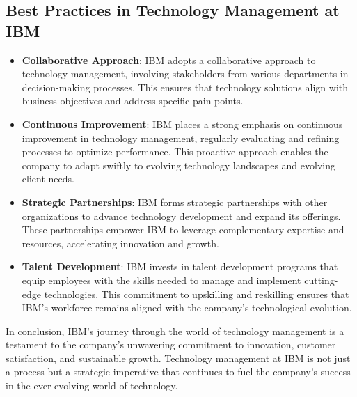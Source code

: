   \subsection{Best Practices in Technology Management at IBM }

  \begin{itemize}
  \item \textbf{Collaborative Approach}:
IBM adopts a collaborative approach to technology management, involving stakeholders from various departments in decision-making processes. This ensures that technology solutions align with business objectives and address specific pain points.

    
  \item \textbf{Continuous Improvement}:
IBM places a strong emphasis on continuous improvement in technology management, regularly evaluating and refining processes to optimize performance. This proactive approach enables the company to adapt swiftly to evolving technology landscapes and evolving client needs.

    
  \item \textbf{Strategic Partnerships}:
IBM forms strategic partnerships with other organizations to advance technology development and expand its offerings. These partnerships empower IBM to leverage complementary expertise and resources, accelerating innovation and growth.

    
  \item \textbf{Talent Development}:
IBM invests in talent development programs that equip employees with the skills needed to manage and implement cutting-edge technologies. This commitment to upskilling and reskilling ensures that IBM's workforce remains aligned with the company's technological evolution.


  \end{itemize}
  
  In conclusion, IBM's journey through the world of technology management is a testament to the company's unwavering commitment to innovation, customer satisfaction, and sustainable growth. Technology management at IBM is not just a process but a strategic imperative that continues to fuel the company's success in the ever-evolving world of technology.
  
